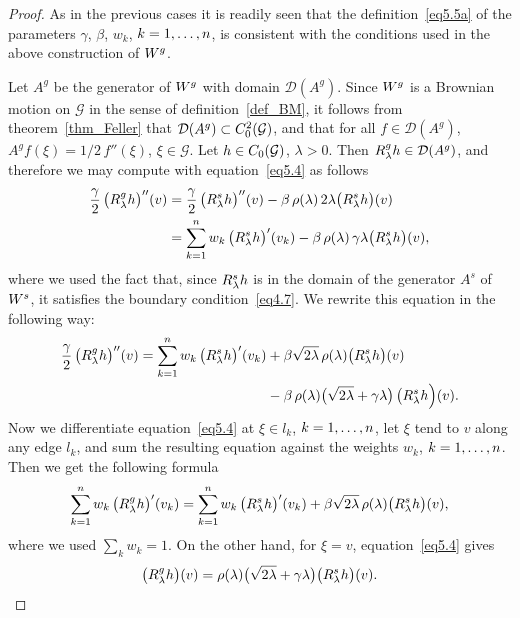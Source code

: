 \documentclass[11pt,a4paper]{amsart}
\newcommand{\gb}{\beta}
\renewcommand{\gg}{\gamma}
\newcommand{\gl}{\lambda}
\newcommand{\cD}{\mathcal{D}}
\newcommand{\cG}{\mathcal{G}}
\newcommand{\1}{1}
\theoremstyle{remark}
\newcommand{\sgl}{\ensuremath\sqrt{2\gl}}
\newcommand{\Co}{\ensuremath C_0(\cG)}
\newcommand{\Cii}{\ensuremath C_0^2(\cG)}
\newcommand{\kn}{\ensuremath k=1,\dotsc,n}
\newcommand{\Ws}{\ensuremath W^s}
\newcommand{\RsW}{\ensuremath R^s}
\newcommand{\Wg}{\ensuremath W^g}
\newcommand{\Rg}{\ensuremath R^g}
\numberwithin{equation}{section}
\begin{document}
\begin{proof}
As in the previous cases it is readily seen that the definition~\eqref{eq5.5a} of
the parameters $\gg$, $\gb$, $w_k$, $\kn$, is consistent with the conditions used in
the above construction of $\Wg$.

Let $A^g$ be the generator of $\Wg$ with domain $\cD(A^g)$. Since $\Wg$ is a Brownian
motion on $\cG$ in the sense of definition~\ref{def_BM}, it follows from
theorem~\ref{thm_Feller} that $\cD(A^g)\subset \Cii$, and that for all $f\in\cD(A^g)$,
$A^g f(\xi) = 1/2\,f''(\xi)$, $\xi\in\cG$. Let $h\in\Co$, $\gl>0$. Then $\Rg_\gl
h\in\cD(A^g)$, and therefore we may compute with equation~\eqref{eq5.4} as follows
\begin{align*}
    \frac{\gg}{2}\,\bigl(\Rg_\gl h\bigr)''(v)
        &= \frac{\gg}{2}\,\bigl(\RsW_\gl h\bigr)''(v)
            - \gb\,\rho(\gl)\,2\gl \bigl(\RsW_\gl h\bigr)(v)\\
        &= \sum_{k=1}^n w_k\,\bigl(\RsW_\gl h\bigr)'(v_k)
            - \gb\,\rho(\gl)\,\gg\gl \bigl(\RsW_\gl h\bigr)(v),
\end{align*}
where we used the fact that, since $\RsW_\gl h$ is in the domain of the generator $A^s$ of
$\Ws$, it satisfies the boundary condition~\eqref{eq4.7}. We rewrite this equation
in the following way:
\begin{equation}    \label{eq5.5}
\begin{split}
    \frac{\gg}{2}\,\bigl(\Rg_\gl h\bigr)''(v)
        = \sum_{k=1}^n w_k\,\bigl(\RsW_\gl h\bigr)'(v_k)
                &+\gb\sgl\,\rho(\gl) \bigl(\RsW_\gl h\bigr)(v)\\
                &-\gb\,\rho(\gl)\bigl(\sgl+\gg\gl\bigr)\,\bigl(\RsW_\gl h\Bigr)(v).
\end{split}
\end{equation}
Now we differentiate equation~\eqref{eq5.4} at $\xi\in l_k$, $\kn$, let $\xi$ tend to
$v$ along any edge $l_k$, and sum the resulting equation against the weights $w_k$,
$\kn$. Then we get the following formula
\begin{equation}    \label{eq5.6}
    \sum_{k=1}^n w_k\,\bigl(\Rg_\gl h\bigr)'(v_k)
        = \sum_{k=1}^n w_k\,\bigl(\RsW_\gl h\bigr)'(v_k)
            + \gb\sgl\,\rho(\gl)\bigl(\RsW_\gl h\bigr)(v),
\end{equation}
where we used $\sum_k w_k=1$. On the other hand, for $\xi=v$, equation~\eqref{eq5.4}
gives
\begin{equation}    \label{eq5.7}
    \bigl(\Rg_\gl h\bigr)(v) = \rho(\gl)\bigl(\sgl +\gg\gl\bigr)\bigl(\RsW_\gl h\bigr)(v).

\end{equation}
\end{proof}
\end{document}

